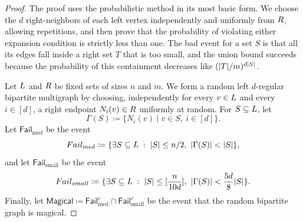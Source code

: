 \begin{proof}
	The proof uses the probabilistic method in its most basic form. We choose the \(d\) right-neighbors of each left vertex independently and uniformly from \(R\), allowing repetitions, and then prove that the probability of violating either expansion condition is strictly less than one. The bad event for a set \(S\) is that all its edges fall inside a right set \(T\) that is too small, and the union bound succeeds because the probability of this containment decreases like \((\lvert T\rvert/m)^{d\lvert S\rvert}\).

	Let \(L\) and \(R\) be fixed sets of sizes \(n\) and \(m\). We form a random left \(d\)-regular bipartite multigraph by choosing, independently for every \(v\in L\) and every \(i\in[d]\), a right endpoint \(N_i(v)\in R\) uniformly at random. For \(S\subseteq L\), let
	\begin{equation}
		\label{eq:random-neighborhood-definition}
		\Gamma(S)\coloneqq \{N_i(v)\mid v\in S,\ i\in[d]\}.
	\end{equation}
	Let \(\mathsf{Fail}_{\mathrm{med}}\) be the event
	\begin{equation}
		\label{eq:magical-medium-failure-event}
		\mathsf{Fail}_{\mathrm{med}}
		\coloneqq
		\left\{\exists S\subseteq\LeftSet \;:\; \abs{S}\leq n/2,\ \abs{\Gamma(S)}<\abs{S}\right\},
	\end{equation}
	and let \(\mathsf{Fail}_{\mathrm{small}}\) be the event
	\begin{equation}
		\label{eq:magical-small-failure-event}
		\mathsf{Fail}_{\mathrm{small}}
		\coloneqq
		\left\{\exists S\subseteq\LeftSet \;:\; \abs{S}\leq \left\lceil \frac{n}{10d}\right\rceil,\ \abs{\Gamma(S)}<\frac{5d}{8}\abs{S}\right\}.
	\end{equation}
	Finally, let \(\mathsf{Magical}\coloneqq \mathsf{Fail}_{\mathrm{med}}^{c}\cap \mathsf{Fail}_{\mathrm{small}}^{c}\) be the event that the random bipartite graph is magical.


\end{proof}
